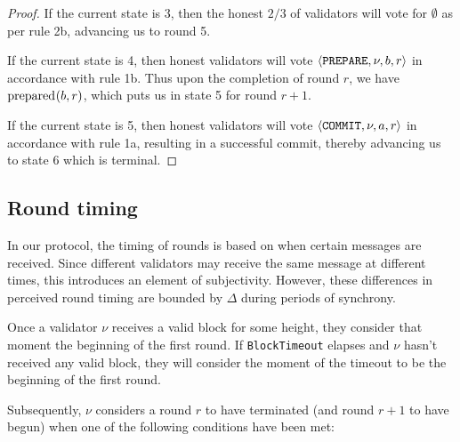\begin{proof}
  If the current state is 3, then the honest $2/3$ of validators will vote for $\emptyset$ as per rule 2b, advancing us to round 5.

  If the current state is 4, then honest validators will vote $\langle\mathtt{PREPARE}, \nu, b, r\rangle$ in accordance with rule 1b. Thus upon the completion of round $r$, we have $\operatorname{prepared}_{}(b, r)$, which puts us in state 5 for round $r + 1$.

  If the current state is 5, then honest validators will vote $\langle\mathtt{COMMIT}, \nu, a, r\rangle$ in accordance with rule 1a, resulting in a successful commit, thereby advancing us to state 6 which is terminal.
\end{proof}


\subsection{Round timing}
\label{round-timing}

In our protocol, the timing of rounds is based on when certain messages are received. Since different validators may receive the same message at different times, this introduces an element of subjectivity. However, these differences in perceived round timing are bounded by $\Delta$ during periods of synchrony.

Once a validator $\nu$ receives a valid block for some height, they consider that moment the beginning of the first round. If \texttt{BlockTimeout} elapses and $\nu$ hasn't received any valid block, they will consider the moment of the timeout to be the beginning of the first round.

Subsequently, $\nu$ considers a round $r$ to have terminated (and round $r + 1$ to have begun) when one of the following conditions have been met:

